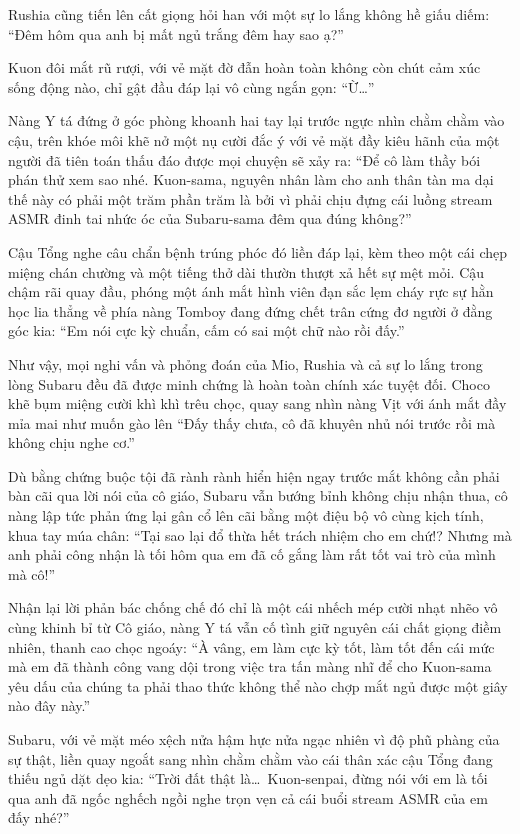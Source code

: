 \documentclass[../main.tex]{subfiles}
\begin{document}
Rushia cũng tiến lên cất giọng hỏi han với một sự lo lắng không hề giấu diếm: ``Đêm hôm qua anh bị mất ngủ trắng đêm hay sao ạ?''

Kuon đôi mắt rũ rượi, với vẻ mặt đờ đẫn hoàn toàn không còn chút cảm xúc sống động nào, chỉ gật đầu đáp lại vô cùng ngắn gọn: ``Ừ\dots''

Nàng Y tá đứng ở góc phòng khoanh hai tay lại trước ngực nhìn chằm chằm vào cậu, trên khóe môi khẽ nở một nụ cười đắc ý với vẻ mặt đầy kiêu hãnh của một người đã tiên toán thấu đáo được mọi chuyện sẽ xảy ra: ``Để cô làm thầy bói phán thử xem sao nhé. Kuon-sama, nguyên nhân làm cho anh thân tàn ma dại thế này có phải một trăm phần trăm là bởi vì phải chịu đựng cái luồng stream ASMR đinh tai nhức óc của Subaru-sama đêm qua đúng không?''

Cậu Tổng nghe câu chẩn bệnh trúng phóc đó liền đáp lại, kèm theo một cái chẹp miệng chán chường và một tiếng thở dài thườn thượt xả hết sự mệt mỏi. Cậu chậm rãi quay đầu, phóng một ánh mắt hình viên đạn sắc lẹm cháy rực sự hằn học lia thẳng về phía nàng Tomboy đang đứng chết trân cứng đơ người ở đằng góc kia: ``Em nói cực kỳ chuẩn, cấm có sai một chữ nào rồi đấy.''

Như vậy, mọi nghi vấn và phỏng đoán của Mio, Rushia và cả sự lo lắng trong lòng Subaru đều đã được minh chứng là hoàn toàn chính xác tuyệt đối. Choco khẽ bụm miệng cười khì khì trêu chọc, quay sang nhìn nàng Vịt với ánh mắt đầy mỉa mai như muốn gào lên ``Đấy thấy chưa, cô đã khuyên nhủ nói trước rồi mà không chịu nghe cơ.''

Dù bằng chứng buộc tội đã rành rành hiển hiện ngay trước mắt không cần phải bàn cãi qua lời nói của cô giáo, Subaru vẫn bướng bỉnh không chịu nhận thua, cô nàng lập tức phản ứng lại gân cổ lên cãi bằng một điệu bộ vô cùng kịch tính, khua tay múa chân: ``Tại sao lại đổ thừa hết trách nhiệm cho em chứ!? Nhưng mà anh phải công nhận là tối hôm qua em đã cố gắng làm rất tốt vai trò của mình mà cô!''

Nhận lại lời phản bác chống chế đó chỉ là một cái nhếch mép cười nhạt nhẽo vô cùng khinh bỉ từ Cô giáo, nàng Y tá vẫn cố tình giữ nguyên cái chất giọng điềm nhiên, thanh cao chọc ngoáy: ``À vâng, em làm cực kỳ tốt, làm tốt đến cái mức mà em đã thành công vang dội trong việc tra tấn màng nhĩ để cho Kuon-sama yêu dấu của chúng ta phải thao thức không thể nào chợp mắt ngủ được một giây nào đây này.''

Subaru, với vẻ mặt méo xệch nửa hậm hực nửa ngạc nhiên vì độ phũ phàng của sự thật, liền quay ngoắt sang nhìn chằm chằm vào cái thân xác cậu Tổng đang thiếu ngủ dặt dẹo kia: ``Trời đất thật là\dots\ Kuon-senpai, đừng nói với em là tối qua anh đã ngốc nghếch ngồi nghe trọn vẹn cả cái buổi stream ASMR của em đấy nhé?''
\end{document}
